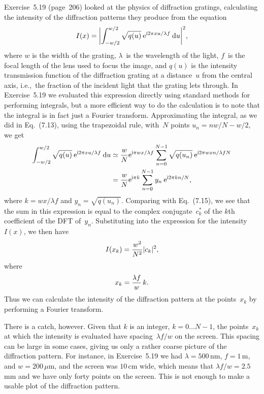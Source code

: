 \documentclass[12pt]{article}
\begin{document}
\begin{exercises}
\exskip Exercise~5.19 (page~206) looked at the physics of diffraction
gratings, calculating the intensity of the diffraction patterns they
produce from the equation
\begin{displaymath}
I(x) = \biggl| \int_{-w/2}^{w/2} \sqrt{q(u)}\>
               \mathrm{e}^{\mathrm{i} 2\pi xu/\lambda f} \>\mathrm{d} u \biggr|^2,
\end{displaymath}
where $w$ is the width of the grating, $\lambda$~is the wavelength of the
light, $f$~is the focal length of the lens used to focus the image, and
$q(u)$ is the intensity transmission function of the diffraction grating at
a distance~$u$ from the central axis, i.e.,~the fraction of the incident
light that the grating lets through.  In Exercise~5.19 we evaluated this
expression directly using standard methods for performing integrals, but a
more efficient way to do the calculation is to note that the integral is in
fact just a Fourier transform.  Approximating the integral, as we did in
Eq.~(7.13), using the trapezoidal rule, with~$N$ points $u_n=nw/N-w/2$, we
get
\begin{align*}
\int_{-w/2}^{w/2} \sqrt{q(u)}\>\mathrm{e}^{\mathrm{i} 2\pi xu/\lambda f} \>\mathrm{d} u
  &\simeq {w\over N} \mathrm{e}^{\mathrm{i}\pi wx/\lambda f}
     \sum_{n=0}^{N-1} \sqrt{q(u_n)} \>\mathrm{e}^{\mathrm{i} 2\pi wxn/\lambda f N} \\
  &= {w\over N} \mathrm{e}^{\mathrm{i}\pi k}
     \sum_{n=0}^{N-1} y_n \>\mathrm{e}^{\mathrm{i} 2\pi kn/N},
\end{align*}
where $k=wx/\lambda f$ and $y_n=\sqrt{q(u_n)}$.  Comparing with Eq.~(7.15),
we see that the sum in this expression is equal to the complex
conjugate~$c_k^*$ of the $k$th coefficient of the DFT of~$y_n$.
Substituting into the expression for the intensity~$I(x)$, we then have
\begin{displaymath}
I(x_k) = {w^2\over N^2} |c_k|^2,
\end{displaymath}
where
\begin{displaymath}
x_k = {\lambda f\over w}\,k.
\end{displaymath}
Thus we can calculate the intensity of the diffraction pattern at the
points~$x_k$ by performing a Fourier transform.

There is a catch, however.  Given that $k$ is an integer, $k=0\ldots N-1$,
the points~$x_k$ at which the intensity is evaluated have spacing~$\lambda
f/w$ on the screen.  This spacing can be large in some cases, giving us
only a rather coarse picture of the diffraction pattern.  For instance, in
Exercise~5.19 we had $\lambda=500\,$nm, $f=1\,$m, and $w=200\,\mu$m, and
the screen was $10\,$cm wide, which means that $\lambda f/w = 2.5\,$mm and
we have only forty points on the screen.  This is not enough to make a
usable plot of the diffraction pattern.


\end{exercises}
\end{document}
